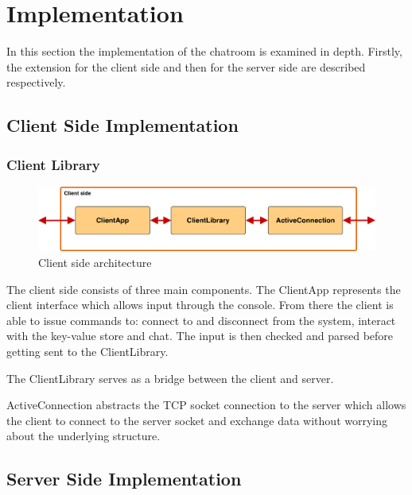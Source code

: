 \section{Implementation}
\label{sec:implementation}

In this section the implementation of the chatroom is examined in depth. Firstly, the extension for the client side and then for the server side are described respectively. 

\subsection{Client Side Implementation}
\label{sec:Implementation_clintside}


\subsubsection{Client Library}
\label{sec:implementation_clientside_clientlib}

\begin{figure}[h]
	\centering
	\includegraphics[width=\linewidth]{figures/client_arch.png}
	\caption{Client side architecture}
	\label{fig:client_arch}
\end{figure}


The client side consists of three main components. The ClientApp represents the client interface which allows input through the console. From there the client is able to issue commands to: connect to and disconnect from the system, interact with the key-value store and chat. The input is then checked and parsed before getting sent to the ClientLibrary.

The ClientLibrary serves as a bridge between the client and server.

ActiveConnection abstracts the TCP socket connection to the server which allows the client to connect to the server socket and exchange data without worrying about the underlying structure.

 
\subsection{Server Side Implementation}
\label{sec:implementation_serverside}

